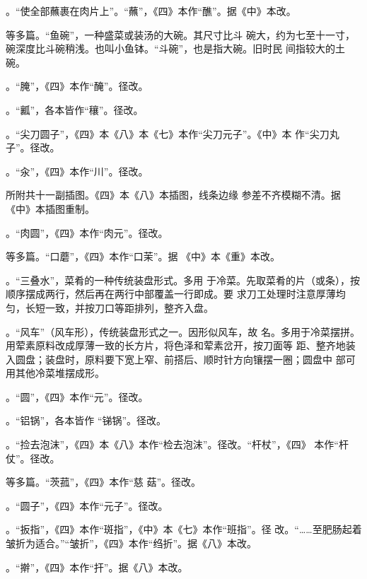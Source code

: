 \begin{list}{}
。“使全部蘸裹在肉片上”。“蘸”，《四》本作“醮”。据《中》本改。

等多篇。“鱼碗”，一种盛菜或装汤的大碗。其尺寸比斗
碗大，约为七至十一寸，碗深度比斗碗稍浅。也叫小鱼钵。“斗碗”，也是指大碗。旧时民
间指较大的土碗。

。“腌”，《四》本作“醃”。径改。

。“瓤”，各本皆作“穰”。径改。

。“尖刀圆子”，《四》本《八》本《七》本作“尖刀元子”。《中》本
作“尖刀丸子”。径改。

。“汆”，《四》本作“川”。径改。

所附共十一副插图。《四》本《八》本插图，线条边缘
参差不齐模糊不清。据《中》本插图重制。

。“肉圆”，《四》本作“肉元”。径改。

等多篇。“口蘑”，《四》本作“口茉”。据
《中》本《重》本改。

。“三叠水”，菜肴的一种传统装盘形式。多用
于冷菜。先取菜肴的片（或条），按顺序摆成两行，然后再在两行中部覆盖一行即成。要
求刀工处理时注意厚薄均匀，长短一致，并按刀口等距排列，整齐入盘。

。“风车”（风车形），传统装盘形式之一。因形似风车，故
名。多用于冷菜摆拼。用荤素原料改成厚薄一致的长方片，将色泽和荤素岔开，按刀面等
距、整齐地装入圆盘；装盘时，原料要下宽上窄、前搭后、顺时针方向镶摆一圈；圆盘中
部可用其他冷菜堆摆成形。

。“圆”，《四》本作“元”。径改。

。“铝锅”，各本皆作
“锑锅”。\xeCJKnobreak{}径改。

。“捡去泡沫”，《四》本《八》本作“检去泡沫”。径改。“杆杖”，《四》
本作“杆仗”。径改。

等多篇。“茨菰”，《四》本作“慈
菇”。径改。

。“圆子”，《四》本作“元子”。径改。

。“扳指”，《四》本作“斑指”，《中》本《七》本作“班指”。径
改。“……至肥肠起着皱折为适合。”“皱折”，《四》本作“绉折”。据《八》本改。

。“擀”，《四》本作“扞”。据《八》本改。


\end{list}
